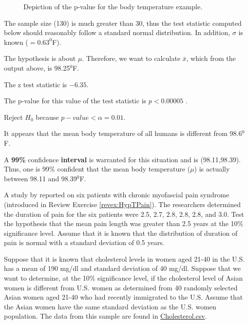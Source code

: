 \documentclass[10pt,openany]{book}\usepackage[]{graphicx}\usepackage[]{color}
\newenvironment{knitrout}{}{} %
\begin{document}
\begin{Enumerate}
\begin{knitrout}
\begin{figure}[!h]
{}

\caption[Depiction of the p-value for the body temperature example]{Depiction of the p-value for the body temperature example.}\label{fig:Ex2Zpvalue}
\end{figure}


\end{knitrout}
  \item The sample size (130) is much greater than 30, thus the test statistic computed below should reasonably follow a standard normal distribution.  In addition, $\sigma$ is known ($=0.63^{0}$F).
  \item The hypothesis is about $\mu$.  Therefore, we want to calculate $\bar{x}$, which from the output above, is 98.25$^{0}$F.
  \item The z test statistic is \ensuremath{-6.35}.
  \item The p-value for this value of the test statistic is $p<0.00005$ .
  \item Reject $H_{0}$ because $p-value<\alpha=0.01$.
  \item It appears that the mean body temperature of all humans is different from 98.6$^{0}$F.
  \item A \textbf{99\%} confidence \textbf{interval} is warranted for this situation and is (98.11,98.39).  Thus, one is 99\% confident that the mean body temperature ($\mu$) is actually between 98.11 and 98.39$^{0}$F.
\end{Enumerate}

\begin{exsection}
  \item \label{revex:HypTestZPain} \rhw{} A study by \cite{Cheshireetal1994} reported on six patients with chronic myofascial pain syndrome (introduced in Review Exercise \ref{revex:HypTPain}).  The researchers determined the duration of pain for the six patients were 2.5, 2.7, 2.8, 2.8, 2.8, and 3.0.  Test the hypothesis that the mean pain length was greater than 2.5 years at the 10\% significance level.  Assume that it is known that the distribution of duration of pain is normal with a standard deviation of 0.5 years. 

  \item \label{revex:HypTestAsianCholest} \rhw{} Suppose that it is known that cholesterol levels in women aged 21-40 in the U.S. has a mean of 190 mg/dl and standard deviation of 40 mg/dl.  Suppose that we want to determine, at the 10\% significance level, if the cholesterol level of Asian women is different from U.S. women as determined from 40 randomly selected Asian women aged 21-40 who had recently immigrated to the U.S.  Assume that the Asian women have the same standard deviation as the U.S. women population.  The data from this sample are found in \href{https://raw.githubusercontent.com/droglenc/NCData/master/Cholesterol.csv}{Cholesterol.csv}.  
\end{exsection}
\end{document}
